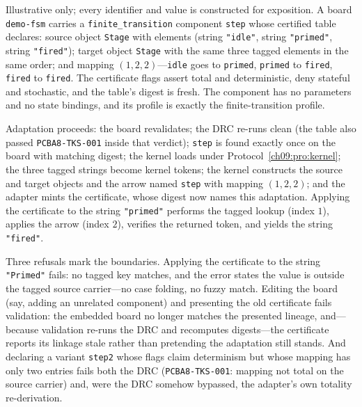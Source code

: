 \begin{example}\label{ch09:ex:worked}
Illustrative only; every identifier and value is constructed for exposition. A board \texttt{demo-fsm} carries a \texttt{finite\_transition} component \texttt{step} whose certified table declares: source object \texttt{Stage} with elements (string \texttt{"idle"}, string \texttt{"primed"}, string \texttt{"fired"}); target object \texttt{Stage} with the same three tagged elements in the same order; and mapping $(1, 2, 2)$---\texttt{idle} goes to \texttt{primed}, \texttt{primed} to \texttt{fired}, \texttt{fired} to \texttt{fired}. The certificate flags assert total and deterministic, deny stateful and stochastic, and the table's digest is fresh. The component has no parameters and no state bindings, and its profile is exactly the finite-transition profile.

Adaptation proceeds: the board revalidates; the DRC re-runs clean (the table also passed \texttt{PCBA8-TKS-001} inside that verdict); \texttt{step} is found exactly once on the board with matching digest; the kernel loads under Protocol~\ref{ch09:pro:kernel}; the three tagged strings become kernel tokens; the kernel constructs the source and target objects and the arrow named \texttt{step} with mapping $(1,2,2)$; and the adapter mints the certificate, whose digest now names this adaptation. Applying the certificate to the string \texttt{"primed"} performs the tagged lookup (index $1$), applies the arrow (index $2$), verifies the returned token, and yields the string \texttt{"fired"}.

Three refusals mark the boundaries. Applying the certificate to the string \texttt{"Primed"} fails: no tagged key matches, and the error states the value is outside the tagged source carrier---no case folding, no fuzzy match. Editing the board (say, adding an unrelated component) and presenting the old certificate fails validation: the embedded board no longer matches the presented lineage, and---because validation re-runs the DRC and recomputes digests---the certificate reports its linkage stale rather than pretending the adaptation still stands. And declaring a variant \texttt{step2} whose flags claim determinism but whose mapping has only two entries fails both the DRC (\texttt{PCBA8-TKS-001}: mapping not total on the source carrier) and, were the DRC somehow bypassed, the adapter's own totality re-derivation.
\end{example}

